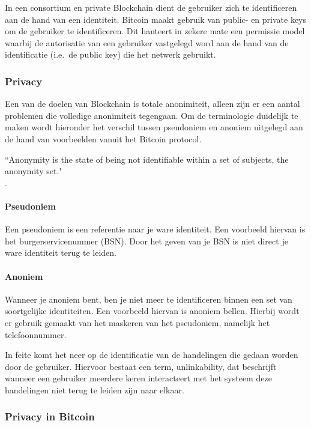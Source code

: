 In een consortium en private Blockchain dient de gebruiker zich te identificeren aan de hand van een identiteit. Bitcoin maakt gebruik van public- en private keys om de gebruiker te identificeren. Dit hanteert in zekere mate een permissie model waarbij de autorisatie van een gebruiker vastgelegd word aan de hand van de identificatie (i.e.\ de public key) die het netwerk gebruikt.

\subsubsection{Privacy}

Een van de doelen van Blockchain is totale anonimiteit, alleen zijn er een aantal problemen die volledige anonimiteit tegengaan. Om de terminologie duidelijk te maken wordt hieronder het verschil tussen pseudoniem en anoniem uitgelegd aan de hand van voorbeelden vanuit het Bitcoin protocol.

\begin{formal}
  ``Anonymity is the state of being not identifiable within a set of subjects, the anonymity set."
  \\ \cite{pfitzmann2001anonymity}.
\end{formal}

\paragraph{Pseudoniem} 

Een pseudoniem is een referentie naar je ware identiteit. Een voorbeeld hiervan is het burgerservicenummer (BSN). Door het geven van je BSN is niet direct je ware identiteit terug te leiden.

\paragraph{Anoniem}

Wanneer je anoniem bent, ben je niet meer te identificeren binnen een set van soortgelijke identiteiten. Een voorbeeld hiervan is anoniem bellen. Hierbij wordt er gebruik gemaakt van het maskeren van het pseudoniem, namelijk het telefoonnummer.

In feite komt het neer op de identificatie van de handelingen die gedaan worden door de gebruiker. Hiervoor bestaat een term, unlinkability, dat beschrijft wanneer een gebruiker meerdere keren interacteert met het systeem deze handelingen niet terug te leiden zijn naar elkaar.

\subsubsection{Privacy in Bitcoin}

